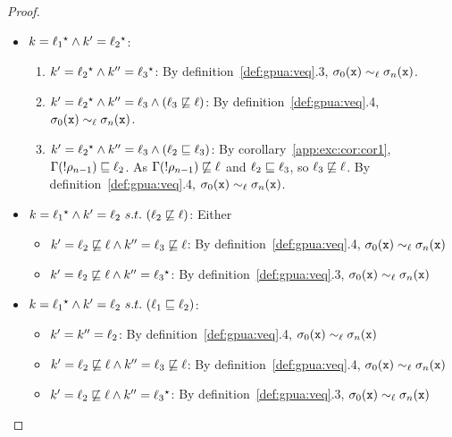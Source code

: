 \begin{proof}
\begin{itemize}
\item $k =   \ell_1  {}^\star   \wedge k' = \ell_2  {}^\star  $:  
  \begin{enumerate}
  \item $k' =   \ell_2  {}^\star   \wedge k'' = \ell_3  {}^\star  $: By
    definition~\ref{def:gpua:veq}.3, $\sigma_0(\texttt{x}) \sim_\ell
    \sigma_n(\texttt{x})$.  
  \item $k' =   \ell_2  {}^\star   \wedge k'' = \ell_3 \wedge (\ell_3
    \not\sqsubseteq \ell)$: By definition~\ref{def:gpua:veq}.4,
    $\sigma_0(\texttt{x}) \sim_\ell \sigma_n(\texttt{x})$.
  \item $k' =   \ell_2  {}^\star   \wedge k'' = \ell_3 \wedge (\ell_2
    \sqsubseteq \ell_3)$:   
      By corollary~\ref{app:exc:cor:cor1}, $\Gamma(!\rho_{n-1})
      \sqsubseteq \ell_2$. As $\Gamma(!\rho_{n-1}) \not\sqsubseteq 
      \ell$ and $\ell_2 \sqsubseteq \ell_3$, so $\ell_3
      \not\sqsubseteq \ell$. By definition~\ref{def:gpua:veq}.4, $\sigma_0(\texttt{x}) \sim_\ell
      \sigma_n(\texttt{x})$.
  \end{enumerate}

\item $k =   \ell_1  {}^\star   \wedge k' =
  \ell_2~s.t.~(\ell_2 \not\sqsubseteq \ell)$: Either
  \begin{itemize}
  \item $k' = \ell_2 \not\sqsubseteq \ell \wedge k'' =
    \ell_3 \not\sqsubseteq \ell$: By definition~\ref{def:gpua:veq}.4, $\sigma_0(\texttt{x}) \sim_\ell
    \sigma_n(\texttt{x})$
  \item $k' = \ell_2 \not\sqsubseteq \ell \wedge k'' =     \ell_3  {}^\star
    $: By definition~\ref{def:gpua:veq}.3, $\sigma_0(\texttt{x}) \sim_\ell 
    \sigma_n(\texttt{x})$
  \end{itemize}

\item $k =   \ell_1  {}^\star   \wedge k' = \ell_2~s.t.~ (\ell_1 \sqsubseteq \ell_2)$: 
  \begin{itemize}
  \item $k' = k'' = \ell_2$: By definition~\ref{def:gpua:veq}.4, $\sigma_0(\texttt{x}) \sim_\ell
    \sigma_n(\texttt{x})$
  \item $k' = \ell_2 \not\sqsubseteq \ell \wedge k'' =
    \ell_3 \not\sqsubseteq \ell$: By definition~\ref{def:gpua:veq}.4, $\sigma_0(\texttt{x}) \sim_\ell
    \sigma_n(\texttt{x})$
  \item $k' = \ell_2 \not\sqsubseteq \ell \wedge k'' =
    \ell_3  {}^\star $: By definition~\ref{def:gpua:veq}.3, $\sigma_0(\texttt{x}) \sim_\ell
    \sigma_n(\texttt{x})$
  \end{itemize}


\end{itemize}
\end{proof}
